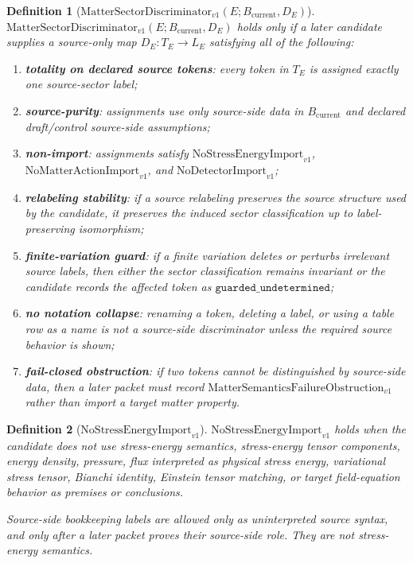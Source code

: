 \documentclass[11pt]{article}
\newcommand{\Bcur}{B_{\mathrm{current}}}
\newcommand{\Discriminator}{\mathrm{MatterSectorDiscriminator}_{v1}}
\newcommand{\NoSE}{\mathrm{NoStressEnergyImport}_{v1}}
\newcommand{\NoAction}{\mathrm{NoMatterActionImport}_{v1}}
\newcommand{\NoDetector}{\mathrm{NoDetectorImport}_{v1}}
\newcommand{\FailureObs}{\mathrm{MatterSemanticsFailureObstruction}_{v1}}
\newtheorem{definition}{Definition}
\begin{document}
\begin{definition}[\(\Discriminator(E;\Bcur,D_E)\)]
\(\Discriminator(E;\Bcur,D_E)\) holds only if a later candidate supplies a
source-only map \(D_E:T_E\to L_E\) satisfying all of the following:
\begin{enumerate}[leftmargin=*]
\item \textbf{totality on declared source tokens}: every token in \(T_E\) is
  assigned exactly one source-sector label;
\item \textbf{source-purity}: assignments use only source-side data in
  \(\Bcur\) and declared draft/control source-side assumptions;
\item \textbf{non-import}: assignments satisfy \(\NoSE\), \(\NoAction\), and
  \(\NoDetector\);
\item \textbf{relabeling stability}: if a source relabeling preserves the
  source structure used by the candidate, it preserves the induced sector
  classification up to label-preserving isomorphism;
\item \textbf{finite-variation guard}: if a finite variation deletes or
  perturbs irrelevant source labels, then either the sector classification
  remains invariant or the candidate records the affected token as
  \(\mathtt{guarded\_undetermined}\);
\item \textbf{no notation collapse}: renaming a token, deleting a label, or
  using a table row as a name is not a source-side discriminator unless the
  required source behavior is shown;
\item \textbf{fail-closed obstruction}: if two tokens cannot be distinguished
  by source-side data, then a later packet must record \(\FailureObs\) rather
  than import a target matter property.
\end{enumerate}
\end{definition}

\begin{definition}[\(\NoSE\)]
\(\NoSE\) holds when the candidate does not use stress-energy semantics,
stress-energy tensor components, energy density, pressure, flux interpreted
as physical stress energy, variational stress tensor, Bianchi identity,
Einstein tensor matching, or target field-equation behavior as premises or
conclusions.

Source-side bookkeeping labels are allowed only as uninterpreted source
syntax, and only after a later packet proves their source-side role. They are
not stress-energy semantics.
\end{definition}
\end{document}
